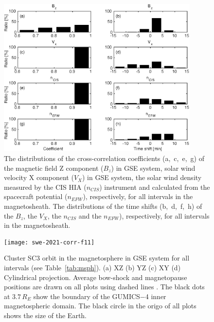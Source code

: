 \documentclass[linenumbers,draft]{agujournal}
\begin{document}
\begin{figure}[h]
\centering
\includegraphics[width=0.9\textwidth,angle=0]{swe-2021-corr-f10}
\caption{The distributions of the cross-correlation coefficients (a,~c,~e,~g) of the magnetic field Z component ($B_z$) in GSE system, solar wind velocity X component ($V_X$) in GSE system, the solar wind density measured by the CIS HIA ($n_{CIS}$) instrument and calculated from the spacecraft potential ($n_{EFW}$), respectively, for all intervals in the magnetosheath. The distributions of the time shifts (b,~d,~f,~h) of the $B_z$, the $V_X$, the $n_{CIS}$ and the $n_{EFW}$), respectively, for all intervals in the magnetosheath.}
\label{fig:mshcorrplot}
\end{figure}

\pagebreak

\begin{figure}[h]
\centering
\texttt{[image: swe-2021-corr-f11]} 
\caption{Cluster SC3 orbit in the magnetosphere in GSE system for all intervals (see Table~\ref{tab:msph}). (a) XZ (b) YZ (c) XY (d) Cylindrical projection. Average bow-shock and magnetopause positions are drawn on all plots using dashed lines \citep[][respectively]{peredo95:_three_alfven_mach,tsyganenko95:_model_earth}. The black dots at $3.7\,R_E$ show the boundary of the GUMICS$-$4 inner magnetospheric domain. The black circle in the origo of all plots shows the size of the Earth.}
\label{fig:msphorbit}
\end{figure}

\pagebreak
\end{document}
